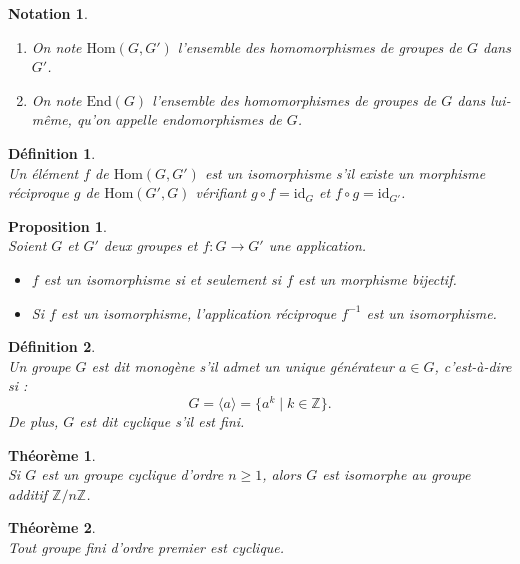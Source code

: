 \documentclass[a4paper, 14pt]{report}
\newtheorem{definition}{Définition}[section]
\newtheorem{notation}{Notation}[section]
\newtheorem{proposition}{Proposition}[section]
\newtheorem{theorem}{Théorème}[section]
\begin{document}
\begin{onehalfspace}
{			\begin{notation} \
				\begin{enumerate} [label=\roman*)]
					\item On note $\mathrm{Hom}(G, G')$ l’ensemble des homomorphismes de groupes de $G$ dans $G'$.
					\item  On note $\mathrm{End}(G)$ l’ensemble des homomorphismes de groupes de $G$ dans lui-même, qu’on appelle endomorphismes de $G$.
				\end{enumerate}
			\end{notation}
			
			\begin{definition} \cite{schaub1997} \\
				Un élément $f$ de $\mathrm{Hom}(G, G')$ est un isomorphisme s’il existe un morphisme réciproque $g$ de $\mathrm{Hom}(G', G)$ vérifiant $g \circ f = \mathrm{id}_G$ et $f \circ g = \mathrm{id}_{G'}$.
			\end{definition}
			
			\begin{proposition} \cite{hall2018theory} \\
				Soient $G$ et $G'$ deux groupes et $f : G \to G'$ une application.
				\begin{itemize}
					\item[(i)] $f$ est un isomorphisme si et seulement si $f$ est un morphisme bijectif.
					\item[(ii)] Si $f$ est un isomorphisme, l’application réciproque $f^{-1}$ est un isomorphisme.
				\end{itemize}
			\end{proposition}
			
			\begin{definition} \cite{schaub1997} \\
				Un groupe \( G \) est dit monogène s'il admet un unique générateur \( a \in G \), c'est-à-dire si :
				\[
				G = \langle a \rangle = \{ a^k \mid k \in \mathbb{Z} \}.
				\]
				De plus, \( G \) est dit cyclique s'il est fini.
			\end{definition}
			
			\begin{theorem} \cite{schaub1997} \\
				Si \( G \) est un groupe cyclique d’ordre \( n \geq 1 \), alors \( G \) est isomorphe au groupe additif \( \mathbb{Z}/n\mathbb{Z} \).
			\end{theorem}
			
			\begin{theorem} \cite{schaub1997} \\
				Tout groupe fini d’ordre premier est cyclique.
			\end{theorem}
			
}
\end{onehalfspace}
\end{document}
